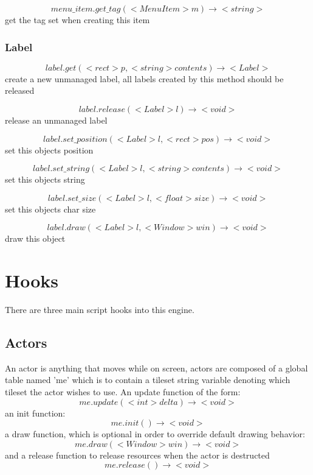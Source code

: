 \documentclass[11pt,fleqn]{book} %
\begin{document}
\begin{equation}
menu\_item.get\_tag(<MenuItem> m) \rightarrow <string>
\end{equation}
get the tag set when creating this item

\subsubsection{Label}

\begin{equation}
label.get(<rect> p, <string> contents) \rightarrow <Label>
\end{equation}
create a new unmanaged label, all labels created by this method should be released

\begin{equation}
label.release(<Label> l) \rightarrow <void>
\end{equation}
release an unmanaged label

\begin{equation}
label.set\_position(<Label> l, <rect> pos) \rightarrow <void>
\end{equation}
set this objects position

\begin{equation}
label.set\_string(<Label> l, <string> contents) \rightarrow <void>
\end{equation}
set this objects string

\begin{equation}
label.set\_size(<Label> l, <float> size) \rightarrow <void>
\end{equation}
set this objects char size

\begin{equation}
label.draw(<Label> l, <Window> win) \rightarrow <void>
\end{equation}
draw this object

\section{Hooks}
There are three main script hooks into this engine.
\subsection{Actors}
An actor is anything that moves while on screen, actors are composed of a global table named 'me' which is to contain a tileset string variable denoting which tileset the actor wishes to use. An update function of the form:
\begin{equation}
me.update(<int> delta) \rightarrow <void>
\end{equation}
an init function:
\begin{equation}
me.init() \rightarrow <void>
\end{equation}
a draw function, which is optional in order to override default drawing behavior:
\begin{equation}
me.draw(<Window> win) \rightarrow <void>
\end{equation}
and a release function to release resources when the actor is destructed
\begin{equation}
me.release() \rightarrow <void>
\end{equation}
\end{document}
